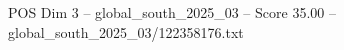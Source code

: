 \begin{textsample}{POS Dim 3 – global\_south\_2025\_03 – Score 35.00 – global\_south\_2025\_03/122358176.txt}
\end{textsample}
